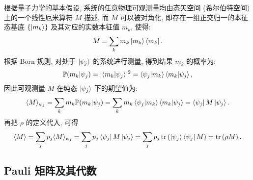 \documentclass[a4paper]{ctexart}
\begin{document}
根据量子力学的基本假设, 系统的任意物理可观测量均由态矢空间 (希尔伯特空间) 上的一个线性厄米算符 $M$ 描述, 而 $M$ 可以被对角化, 即存在一组正交归一的本征态基底 $\{\ket{m_k}\}$ 及其对应的实数本征值 $m_k$, 使得:
\begin{equation}
    M=\sum_k m_k \ket{m_k}\bra{m_k}.
\end{equation}
根据 Born 规则, 对处于 $\ket{\psi_j}$ 的系统进行测量, 得到结果 $m_k$ 的概率为:
\begin{equation}
    \mathbb{P}(m_k|\psi_j)=\lvert\braket{m_k|\psi_j}\rvert^2=\braket{\psi_j|m_k}\braket{m_k|\psi_j},
\end{equation}
因此可观测量 $M$ 在纯态 $\ket{\psi_j}$ 下的期望值为:
\begin{equation}
    \langle M \rangle_{\psi_j}=\sum_k m_k \mathbb{P}(m_k|\psi_j)=\sum_k m_k \braket{\psi_j|m_k}\braket{m_k|\psi_j}=\bra{\psi_j}M\ket{\psi_j}.
\end{equation}
再把 $\rho$ 的定义代入, 可得
\begin{equation}
    \langle M \rangle=\sum_j p_j\langle M \rangle_{\psi_j}=\sum_j p_j \bra{\psi_j}M\ket{\psi_j}=\sum_j p_j\operatorname{tr}\left(\ket{\psi_j}\bra{\psi_j} M\right)=\operatorname{tr}\left(\rho M\right).
\end{equation}

\subsection{Pauli 矩阵及其代数}
\end{document}
